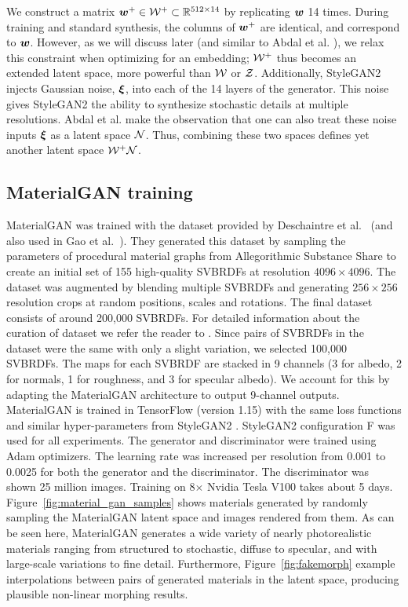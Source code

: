 We construct a matrix $\bm{w}^+ \in \mathcal{W}^+ \subset \mathbb{R}^{512 \times 14}$ by replicating $\bm{w}$ 14 times.
During training and standard synthesis, the columns of $\bm{w}^+$ are identical, and correspond to $\bm{w}$.
However, as we will discuss later (and similar to Abdal et al. ), we relax this constraint when optimizing for an embedding; $\mathcal{W}^+$ thus becomes an extended latent space, more powerful than $\mathcal{W}$ or $\mathcal{Z}$.
%
Additionally, StyleGAN2 injects Gaussian noise, $\bm{\xi}$, into each of the 14 layers of the generator.
This noise gives StyleGAN2 the ability to synthesize stochastic details at multiple resolutions.
Abdal et al.  make the observation that one can also treat these noise inputs $\bm{\xi}$ as a latent space $\mathcal{N}$. Thus, combining these two spaces defines yet another latent space $\mathcal{W}^+\mathcal{N}$.
%

%
\subsection{MaterialGAN training}
\label{ssec:training}
%
MaterialGAN was trained with the dataset provided by Deschaintre et al.~ (and also used in Gao et al.~). They generated this dataset by sampling the parameters of procedural material graphs from Allegorithmic Substance Share to create an initial set of 155 high-quality SVBRDFs at resolution $4096 \times 4096$. The dataset was augmented by blending multiple SVBRDFs and generating $256 \times 256$ resolution crops at random positions, scales and rotations. The final dataset consists of around 200,000 SVBRDFs. For detailed information about the curation of dataset we refer the reader to \cite{Deschaintre2018}. Since pairs of SVBRDFs in the dataset were the same with only a slight variation, we selected 100,000 SVBRDFs.
%
The maps for each SVBRDF are stacked in 9 channels (3 for albedo, 2 for normals, 1 for roughness, and 3 for specular albedo). We account for this by adapting the MaterialGAN architecture to output 9-channel outputs. MaterialGAN is trained in TensorFlow (version 1.15) with the same loss functions and similar hyper-parameters from StyleGAN2 \cite{StyleGAN2}. StyleGAN2 configuration F was used for all experiments. The generator and discriminator were trained using Adam optimizers. The learning rate was increased per resolution from 0.001 to 0.0025 for both the generator and the discriminator. The discriminator was shown 25 million images. Training on 8$\times$ Nvidia Tesla V100 takes about 5 days.
%
Figure~\ref{fig:material_gan_samples} shows materials generated by randomly sampling the MaterialGAN latent space and images rendered from them. As can be seen here, MaterialGAN generates a wide variety of nearly photorealistic materials ranging from structured to stochastic, diffuse to specular, and with large-scale variations to fine detail. Furthermore, Figure~\ref{fig:fakemorph}  example interpolations between pairs of generated materials in the latent space, producing plausible non-linear morphing results.
%


